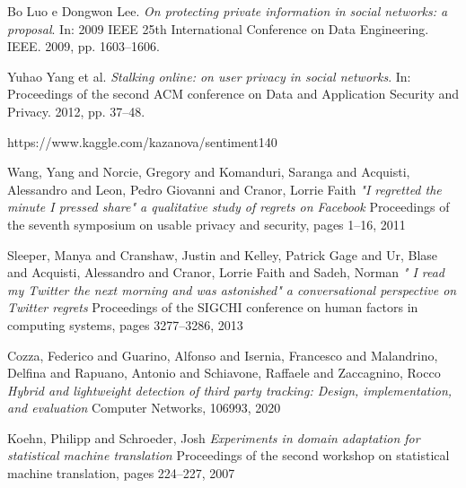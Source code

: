 \begin{thebibliography}{9}
Bo Luo e Dongwon Lee.\newline
\textit{On protecting private information in social networks: a proposal}.\newline
In: 2009 IEEE 25th International Conference on Data Engineering. IEEE. 2009, pp. 1603–1606.

Yuhao Yang et al.\newline
\textit{Stalking online: on user privacy in social networks}.\newline
In: Proceedings of the second ACM conference on Data and Application Security and Privacy. 2012, pp. 37–48.

https://www.kaggle.com/kazanova/sentiment140

Wang, Yang and Norcie, Gregory and Komanduri, Saranga and Acquisti, Alessandro and Leon, Pedro Giovanni and Cranor, Lorrie Faith\newline
\textit{"I regretted the minute I pressed share" a qualitative study of regrets on Facebook}\newline
Proceedings of the seventh symposium on usable privacy and security, pages 1--16, 2011 

Sleeper, Manya and Cranshaw, Justin and Kelley, Patrick Gage and Ur, Blase and Acquisti, Alessandro and Cranor, Lorrie Faith and Sadeh, Norman\newline
\textit{" I read my Twitter the next morning and was astonished" a conversational perspective on Twitter regrets}\newline
Proceedings of the SIGCHI conference on human factors in computing systems, pages 3277--3286, 2013

Cozza, Federico and Guarino, Alfonso and Isernia, Francesco and Malandrino, Delfina and Rapuano, Antonio and Schiavone, Raffaele and Zaccagnino, Rocco\newline
\textit{Hybrid and lightweight detection of third party tracking: Design, implementation, and evaluation}\newline
Computer Networks, 106993, 2020

Koehn, Philipp and Schroeder, Josh\newline
\textit{Experiments in domain adaptation for statistical machine translation}\newline
Proceedings of the second workshop on statistical machine translation, pages 224--227, 2007

\end{thebibliography}